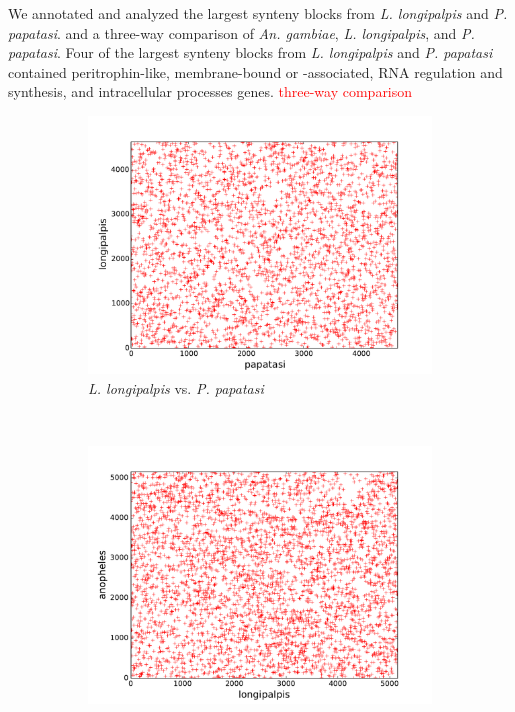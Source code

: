 We annotated and analyzed the largest synteny blocks from \emph{L. longipalpis} and \emph{P. papatasi}. and a three-way comparison of \emph{An. gambiae}, \emph{L. longipalpis}, and \emph{P. papatasi}.  Four of the largest synteny blocks from \emph{L. longipalpis} and \emph{P. papatasi} contained peritrophin-like, membrane-bound or -associated, RNA regulation and synthesis, and intracellular processes genes. \textcolor{red}{three-way comparison}


\begin{figure}[H]
  \centering
  \begin{subfigure}[b]{0.45\textwidth}
    \includegraphics[width=\textwidth]{figures/synteny/papatasi_longipalpis_plot}
    \caption{\emph{L. longipalpis} vs. \emph{P. papatasi}}
    \label{fig:synteny-dotplots-sandflies}
  \end{subfigure}
  \\
  \begin{subfigure}[b]{0.45\textwidth}
    \includegraphics[width=\textwidth]{figures/synteny/longipalpis_anopheles_plot}

\end{subfigure}
\end{figure}
